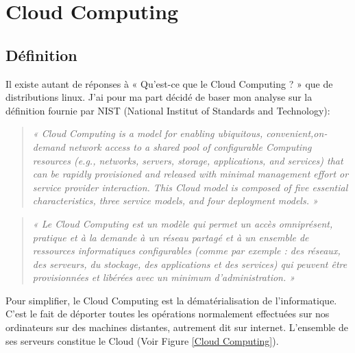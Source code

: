 \chapter{Cloud Computing} \label{CloudComputingAnnexe}

  \section{Définition}
  Il existe autant de réponses à « Qu’est-ce que le Cloud Computing ? » que de distributions linux. J’ai pour ma part décidé de baser mon analyse sur la définition fournie par NIST (National Institut of Standards and Technology):\\

  \begin{quotation}
    \emph{« Cloud Computing is a model for enabling ubiquitous, convenient,on-demand network access to a shared pool of configurable Computing resources (e.g., networks, servers, storage, applications, and services) that can be rapidly provisioned and released with minimal management effort or service provider interaction. This Cloud model is composed of five essential characteristics, three service models, and four deployment models. »}
  \end{quotation}

  \begin{quotation}
    \emph{« Le Cloud Computing est un modèle qui permet un accès omniprésent, pratique et à la demande à un réseau partagé et à un ensemble de ressources informatiques configurables (comme par exemple : des réseaux, des serveurs, du stockage, des applications et des services) qui peuvent être provisionnées et libérées avec un minimum d’administration. »}\\
  \end{quotation}

  Pour simplifier, le Cloud Computing est la dématérialisation de l’informatique. C’est le fait de déporter toutes les opérations normalement effectuées sur nos ordinateurs sur des machines distantes, autrement dit sur internet. L’ensemble de ses serveurs constitue le Cloud (Voir Figure \ref{Cloud Computing}).


